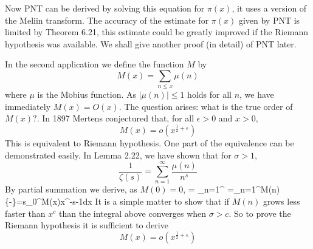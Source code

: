 Now PNT can be derived by solving this equation for $\pi(x)$, it uses a version of the Meliin transform. The accuracy of the estimate for $\pi(x)$ given by PNT is limited by Theorem 6.21, this estimate could be greatly improved if the Riemann hypothesis was available. We shall give another proof (in detail) of PNT
later.

In the second application we define the function $M$ by
$$M(x)=\sum_{n \le x}\mu(n)$$
where $\mu$ is the M$\ddot{\text{o}}$bius function. As $|\mu(n)| \le 1$ holds for all $n$, we have immediately $M(x)=O(x)$. The question arises: what is the true order of $M(x)?$. In 1897 Mertens conjectured that, for all $\epsilon >0$ and $x>0$,
$$M(x) = o\left(x^{\frac{1}{2}+\epsilon}\right)$$
This is equivalent to Riemann hypothesis. One part of the equivalence can be demonstrated easily.
In Lemma 2.22, we have shown that for $\sigma >1$,
$$\frac{1}{\zeta(s)}=\sum_{n=1}^\infty \frac{\mu(n)}{n^s}$$
By partial summation we derive, as $M(0)=0$,
\be
{} = \sum_{n=1}^{\infty}  =\sum_{n=1}^\infty M(n)\left\{-\right\}=s\int_0^{\infty}M(x)x^{-s-1}dx
\ee
It is a simple matter to show that if $M(n)$ grows less faster than $x^c$ than the integral
above converges when $\sigma >c$. So to prove the Riemann hypothesis it is sufficient to derive
$$M(x)=o\left(x^{\frac{1}{2}+\epsilon}\right)$$

